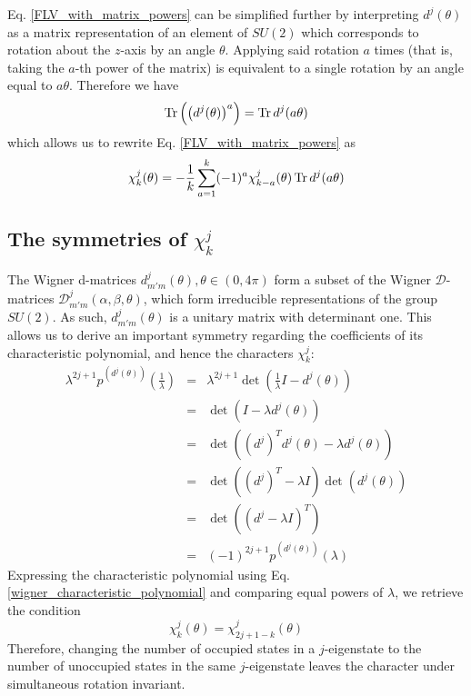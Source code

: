\documentclass[12pt]{article}
\begin{document}
	Eq. \ref{FLV_with_matrix_powers} can be simplified further by interpreting $d^j(\theta)$ as a matrix representation of an element of $SU(2)$ which corresponds to rotation about the $z$-axis by an angle $\theta$. Applying said rotation $a$ times (that is, taking the $a$-th power of the matrix) is equivalent to a single rotation by an angle equal to $a\theta$. Therefore we have
	\begin{equation}
	\Tr\left(\left(d^j(\theta)\right)^a\right) = \Tr d^j(a\theta)
	\end{equation}
	which allows us to rewrite Eq. \ref{FLV_with_matrix_powers} as
	\begin{equation} \label{ensemble_character_recursive_relation}
	\chi^j_k(\theta)=-\frac{1}{k}\sum_{a=1}^k (-1)^{a}\chi^j_{k-a}(\theta)\Tr d^j(a\theta)
	\end{equation}
	
	\subsection{The symmetries of $\chi^j_k$}
	The Wigner d-matrices $d^j_{m'm}(\theta), \theta\in (0,4\pi)$ form a subset of the Wigner $\mathcal{D}$-matrices $\mathcal{D}^j_{m'm}(\alpha, \beta, \theta)$, which form irreducible representations of the group $SU(2)$. As such, $d^j_{m'm}(\theta)$ is a unitary matrix with determinant one. This allows us to derive an important symmetry regarding the coefficients of its characteristic polynomial, and hence the characters $\chi^j_k$:
	\begin{eqnarray}
	\lambda^{2j+1}p^{\left(d^j(\theta)\right)}\left(\frac{1}{\lambda}\right) &=& \lambda^{2j+1}\det(\frac{1}{\lambda}I-d^j(\theta))\\
	&=& \det(I-\lambda d^j(\theta))\\
	&=& \det(\left(d^j\right)^Td^j(\theta)-\lambda d^j(\theta))\\
	&=& \det(\left(d^j\right)^T-\lambda I)\det(d^j(\theta))\\
	&=& \det(\left(d^j-\lambda I\right)^T)\\
	&=& (-1)^{2j+1}p^{\left(d^j(\theta)\right)}(\lambda)
	\end{eqnarray}
	Expressing the characteristic polynomial using Eq. \ref{wigner_characteristic_polynomial} and comparing equal powers of $\lambda$, we retrieve the condition
	\begin{equation}
	\chi^j_k(\theta)=\chi^j_{2j+1-k}(\theta)
	\end{equation}
	Therefore, changing the number of occupied states in a $j$-eigenstate to the number of unoccupied states in the same $j$-eigenstate leaves the character under simultaneous rotation invariant.
	
\end{document}
